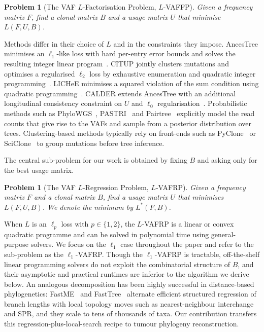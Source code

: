 \documentclass[11pt]{article}
\newtheorem{problem}[theorem]{Problem}
\begin{document}
\begin{problem}[The VAF $L$-Factorisation Problem, $L$-VAFFP]
Given a frequency matrix $F$, find a clonal matrix $B$ and a usage matrix $U$ that minimise $L(F, U, B)$.
\end{problem}

Methods differ in their choice of $L$ and in the constraints they impose. AncesTree minimises an $\ell_1$-like loss with hard per-entry error bounds and solves the resulting integer linear program~\citep{elkebir2015reconstruction}. CITUP jointly clusters mutations and optimises a regularised $\ell_2$ loss by exhaustive enumeration and quadratic integer programming~\citep{malikic2015citup}. LICHeE minimises a squared violation of the sum condition using quadratic programming~\citep{popic2015lichee}. CALDER extends AncesTree with an additional longitudinal consistency constraint on $U$ and $\ell_0$ regularisation~\citep{myers2019calder}. Probabilistic methods such as PhyloWGS~\citep{deshwar2015phylowgs}, PASTRI~\citep{satas2017pastri} and Pairtree~\citep{wintersinger2022pairtree} explicitly model the read counts that give rise to the VAFs and sample from a posterior distribution over trees. Clustering-based methods typically rely on front-ends such as PyClone~\citep{roth2014pyclone} or SciClone~\citep{miller2014sciclone} to group mutations before tree inference.

The central sub-problem for our work is obtained by fixing $B$ and asking only for the best usage matrix.

\begin{problem}[The VAF $L$-Regression Problem, $L$-VAFRP]
Given a frequency matrix $F$ and a clonal matrix $B$, find a usage matrix $U$ that minimises $L(F, U, B)$. We denote the minimum by $L^*(F, B)$.
\end{problem}

When $L$ is an $\ell_p$ loss with $p\in\{1,2\}$, the $L$-VAFRP is a linear or convex quadratic programme and can be solved in polynomial time using general-purpose solvers. We focus on the $\ell_1$ case throughout the paper and refer to the sub-problem as the $\ell_1$-VAFRP. Though the $\ell_1$-VAFRP is tractable, off-the-shelf linear programming solvers do not exploit the combinatorial structure of $B$, and their asymptotic and practical runtimes are inferior to the algorithm we derive below. An analogous decomposition has been highly successful in distance-based phylogenetics: FastME~\citep{desper2002fastme,lefort2015fastme} and FastTree~\citep{price2010fasttree} alternate efficient structured regression of branch lengths with local topology moves such as nearest-neighbour interchange and SPR, and they scale to tens of thousands of taxa. Our contribution transfers this regression-plus-local-search recipe to tumour phylogeny reconstruction.
\end{document}

